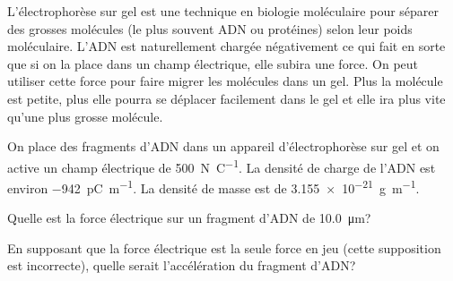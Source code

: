 \begin{diapobox}

  L'électrophorèse sur gel est une technique en biologie moléculaire pour
  séparer des grosses molécules (le plus souvent ADN ou protéines) selon leur
  poids moléculaire. L'ADN est naturellement chargée négativement ce qui fait
  en sorte que si on la place dans un champ électrique, elle subira une force.
  On peut utiliser cette force pour faire migrer les molécules dans un gel.
  Plus la molécule est petite, plus elle pourra se déplacer facilement dans le
  gel et elle ira plus vite qu'une plus grosse molécule.

  On place des fragments d'ADN dans un appareil d'électrophorèse sur gel et on
  active un champ électrique de \SI{500}{\newton\per\coulomb}. La densité de
  charge de l'ADN est environ \SI{-942}{\pico\coulomb\per\meter}. La densité de
  masse est de \SI{3.155e-21}{\gram\per\meter}.

  Quelle est la force électrique sur un fragment d'ADN de
  \SI{10.0}{\micro\meter}?

  En supposant que la force électrique est la seule force en jeu (cette
  supposition est incorrecte), quelle serait l'accélération du fragment d'ADN?

\end{diapobox}



